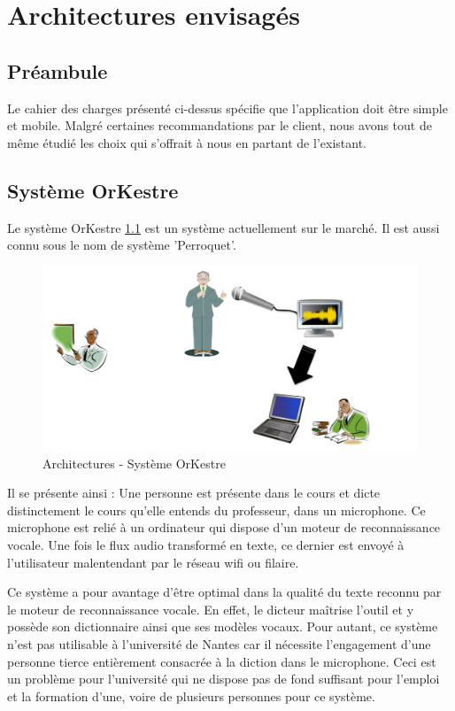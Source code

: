 \chapter{Architectures envisagés}

\section{Préambule}
Le cahier des charges présenté ci-dessus spécifie que l'application doit être
simple et mobile. Malgré certaines recommandations par le client, nous avons
tout de même étudié les choix qui s'offrait à nous en partant de l'existant.

\section{Système OrKestre}

Le système OrKestre \ref{fig:orkestre} est un système actuellement sur le marché. Il est aussi
connu sous le nom de système 'Perroquet'.


\begin{figure}[h]
 \centering
 \includegraphics[scale=0.5]{./img/orKestre.png}
 \caption{Architectures - Système OrKestre}
 \label{fig:orkestre}
\end{figure}

Il se présente ainsi : Une personne est présente dans le cours et dicte distinctement le cours qu'elle entends du professeur, dans un microphone. Ce microphone est relié à un ordinateur qui dispose d'un moteur de reconnaissance vocale. Une fois le flux audio transformé en texte, ce dernier est envoyé à l'utilisateur malentendant par le réseau wifi ou filaire.

Ce système a pour avantage d'être optimal dans la qualité du texte reconnu par le moteur de reconnaissance vocale. En effet, le dicteur maîtrise l'outil et y possède son dictionnaire ainsi que ses modèles vocaux. 
Pour autant, ce système n'est pas utilisable à l'université de Nantes car il nécessite l'engagement d'une personne tierce entièrement consacrée à la diction dans le microphone. Ceci est un problème pour l'université qui ne dispose pas de fond suffisant pour l'emploi et la formation d'une, voire de plusieurs personnes pour ce système.

